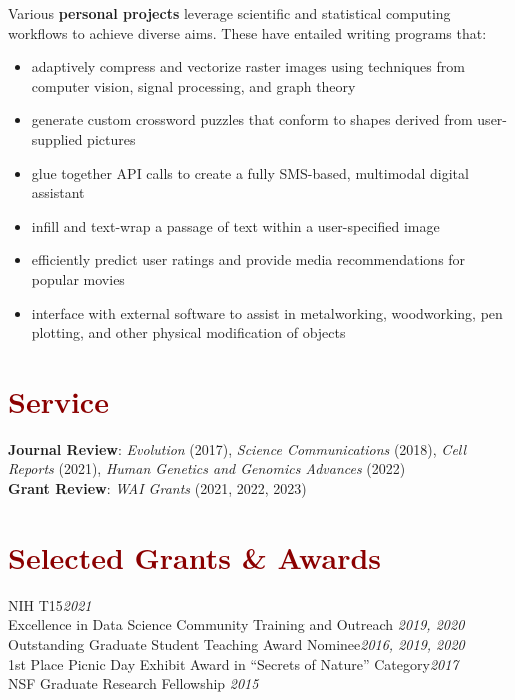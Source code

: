 \documentclass[11pt,margin,line]{resume}
\begin{document}
\begin{resume}
\begin{itemize}
    \end{itemize}

\vspace{-5mm}
Various \textbf{personal projects} leverage scientific and statistical computing workflows to achieve diverse aims. These have entailed writing programs that:

    \begin{itemize}

    \setlength\itemsep{-0.2em}
    	\item adaptively compress and vectorize raster images using techniques from computer vision, signal processing, and graph theory
        \item  generate custom crossword puzzles that conform to shapes derived from user-supplied pictures
        \item glue together API calls to create a fully SMS-based, multimodal digital assistant
        \item infill and text-wrap a passage of text within a user-specified image
        \item efficiently predict user ratings and provide media recommendations for popular movies
        \item interface with external software to assist in metalworking, woodworking, pen plotting, and other physical modification of objects
	         
    \end{itemize}

\vspace{-1.5mm}
\section{\large\textcolor{DarkRed}{Service}}
\textbf{Journal Review}: \emph{Evolution} (2017),  \emph{Science Communications} (2018),  \emph{Cell Reports} (2021), \emph{Human Genetics and Genomics Advances} (2022)\\
\textbf{Grant Review}: \emph{WAI Grants} (2021,  2022,  2023)

\vspace{-1.5mm}
\section{\large\textcolor{DarkRed}{Selected Grants \& Awards}}
NIH T15\hfill \emph{2021}\\
Excellence in Data Science Community Training and Outreach \hfill \emph{2019, 2020}\\
Outstanding Graduate Student Teaching Award Nominee\hfill \emph{2016, 2019, 2020}\\
1st Place Picnic Day Exhibit Award in “Secrets of Nature” Category\hfill \emph{2017}\\
NSF Graduate Research Fellowship \hfill \emph{2015}\\



\end{resume}
\end{document}
